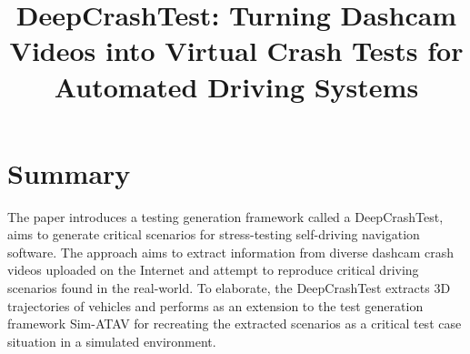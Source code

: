 \documentclass[10pt,a4paper]{report}
\title{DeepCrashTest: Turning Dashcam Videos into Virtual Crash Tests for Automated Driving Systems}
\begin{document}
\begin{center}
\textbf{\thetitle}
\end{center}


\section{Summary}
The paper introduces a testing generation framework called a DeepCrashTest, aims to generate critical scenarios for stress-testing self-driving navigation software.
%
The approach aims to extract information from diverse dashcam crash videos uploaded on the Internet and attempt to reproduce critical driving scenarios found in the real-world.
%
To elaborate, the DeepCrashTest extracts 3D trajectories of vehicles and performs as an extension to the test generation framework Sim-ATAV for recreating the extracted scenarios as a critical test case situation in a simulated environment.
%
\end{document}
